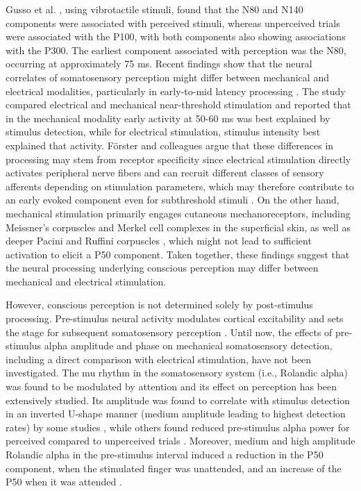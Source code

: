 \documentclass[11pt,a4paper,onecolumn]{article}
\begin{document}
Gusso et al. \cite{gussoMoreFeelingScalp2021}, using vibrotactile stimuli, found that the N80 and N140 components were associated with perceived stimuli, whereas unperceived trials were associated with the P100, with both components also showing associations with the P300. The earliest component associated with perception was the N80, occurring at approximately 75 ms. Recent findings show that the neural correlates of somatosensory perception might differ between mechanical and electrical modalities, particularly in early-to-mid latency processing \cite{forsterERPResponsesReveal2025}. The study compared electrical and mechanical near-threshold stimulation and reported that in the mechanical modality early activity at 50-60 ms was best explained by stimulus detection, while for electrical stimulation, stimulus intensity best explained that activity. Förster and colleagues argue that these differences in processing may stem from receptor specificity since electrical stimulation directly activates peripheral nerve fibers and can recruit different classes of sensory afferents depending on stimulation parameters, which may therefore contribute to an early evoked component even for subthreshold stimuli \cite{forsterERPResponsesReveal2025}. On the other hand, mechanical stimulation primarily engages cutaneous mechanoreceptors, including Meissner's corpuscles and Merkel cell complexes in the superficial skin, as well as deeper Pacini and Ruffini corpuscles \cite{johnsonRolesFunctionsCutaneous2001, abrairaSensoryNeuronsTouch2013}, which might not lead to sufficient activation to elicit a P50 component. Taken together, these findings suggest that the neural processing underlying conscious perception may differ between mechanical and electrical stimulation. 

\vspace{5pt}

However, conscious perception is not determined solely by post-stimulus processing. Pre-stimulus neural activity modulates cortical excitability and sets the stage for subsequent somatosensory perception \cite{stephaniCorticalResponseVariability2022, stephaniNeuralExcitabilitySensory2021}. Until now, the effects of pre-stimulus alpha amplitude and phase on mechanical somatosensory detection, including a direct comparison with electrical stimulation, have not been investigated. 
The mu rhythm in the somatosensory system (i.e., Rolandic alpha) was found to be modulated by attention \cite{andersonAttentionalModulationSomatosensory2011} and its effect on perception has been extensively studied. Its amplitude was found to correlate with stimulus detection in an inverted U-shape manner (medium amplitude leading to highest detection rates) by some studies \cite{zhangDetectionWeakSomatosensory2010, aiPhasePrestimulusAlpha2014, forschackAlphaBandBrainOscillations2017}, while others found reduced pre-stimulus alpha power for perceived compared to unperceived trials \cite{palvaEarlyNeuralCorrelates2005, weiszPrestimulusOscillatoryPower2014, freyTactileWindowConsciousness2016}. Moreover, medium and high amplitude Rolandic alpha in the pre-stimulus interval induced a reduction in the P50 component, when the stimulated finger was unattended, and an increase of the P50 when it was attended \cite{forschackAlphaBandBrainOscillations2017}.
\end{document}
